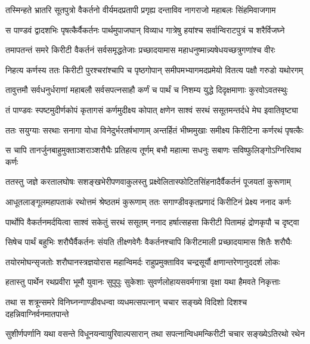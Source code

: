\twolineshloka
{तस्मिन्हते भ्रातरि सूतपुत्रो वैकर्तनो वीर्यमदप्रतापी}
{प्रगृह्य दन्ताविव नागराजो महाबलः सिंहमिवाजगाम}


\twolineshloka
{स पाण्डवं द्वादशभिः पृषत्कैर्वैकर्तनः पार्थमुपाजघान्}
{विव्याध गात्रेषु हयांश्च सर्वान्विराटपुत्रं च शरैर्विजघ्ने}


\twolineshloka
{तमापतन्तं समरे किरीटी वैकर्तनं सर्वसमृद्धतेजाः}
{प्रच्छादयामास महाधनुष्मान्न्यषेधयच्छत्रुगणांश्च वीरः}


\twolineshloka
{निहत्य कर्णस्य ततः किरीटी पुरश्चरांश्चापि च पृष्ठगोपान्}
{समीपमभ्यागमदप्रमेयो वितत्य पक्षौ गरुडो यथोरगम्}


\twolineshloka
{तावुत्तमौ सर्वधनुर्धराणां महाबलौ सर्वसपत्नसाहौ}
{कर्णं च पार्थं च निशम्य युद्धे दिदृक्षमाणाः कुरवोऽवतस्थुः}


\twolineshloka
{तं पाण्डवः स्पष्टमुदीर्णकोपं कृतागसं कर्णमुदीक्ष्य कोपात्}
{क्षणेन साश्वं सरथं ससूतमन्तर्दधे मेघ इवातिवृष्ट्या}


\twolineshloka
{ततः सयुग्याः सरथाः सनागा योधा विनेदुर्भरतर्षभाणाम्}
{अन्तर्हितं भीष्ममुखाः समीक्ष्य किरीटिना कर्णरथं पृषत्कैः}


\twolineshloka
{स चापि तानर्जुनबाहुमुक्ताञ्शराञ्शरौघैः प्रतिहत्य तूर्णम्}
{बभौ महात्मा सधनुः सबाणः सविष्फुलिङ्गोऽग्निरिवाथ कर्णः}


\twolineshloka
{ततस्तु जज्ञे करतालघोषः सशङ्खभेरीपणवाकुलस्तु}
{प्रक्ष्वेलितास्फोटितसिंहनादैर्वैकर्तनं पूजयतां कुरूणाम्}


\twolineshloka
{आधूतलाङ्गूलमहापताकं रथोत्तमं श्रेष्ठतमं कुरूणाम्}
{ततः सगाण्डीवकृतप्रणादं किरीटिनं प्रेक्ष्य ननाद कर्णः}


\twolineshloka
{पार्थोपि वैकर्तनमर्दयित्वा साश्वं सकेतुं सरथं ससूतम्}
{ननाद हर्षात्सहसा किरीटी पितामहं द्रोणकृपौ च दृष्ट्वा}


\twolineshloka
{सिषेच पार्थं बहुभिः शरौघैर्वैकर्तनः संयति तीक्ष्णवेगैः}
{वैकर्तनश्चापि किरीटमाली प्रच्छादयामास शितैः शरौघैः}


\twolineshloka
{तयोरमोघन्सृजतोः शरौघानस्त्रज्ञयोरास महान्विमर्दः}
{राहुप्रमुक्ताविव चन्द्रसूर्यौ क्षणान्तरेणानुददर्श लोकः}


\twolineshloka
{हतास्तु पार्थेन रथप्रवीरा भूमौ युवानः सुपुपुः सुकेशाः}
{सुवर्णलोहायसवर्मगात्रा वृक्षा यथा हैमवते निकृत्ताः}


\twolineshloka
{तथा स शत्रून्समरे विनिघ्नन्गाण्डीवधन्वा व्यधमत्सपत्नान्}
{चचार सङ्ख्ये विदिशो दिशश्च दहन्निवाग्निर्वनमातपान्ते}


\twolineshloka
{सुशीर्णपर्णानि यथा वसन्ते विधूनयन्वायुरिवाल्पसारान्}
{तथा सपत्नान्विधमन्किरीटी चचार सङ्ख्येऽतिरथो रथेन}


